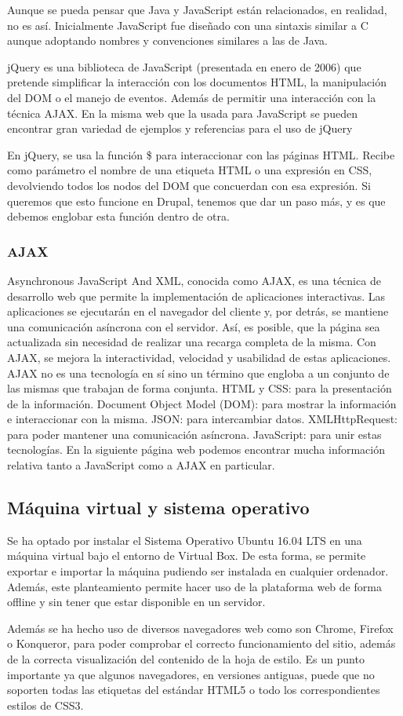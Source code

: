 Aunque se pueda pensar que Java y JavaScript están relacionados, en realidad, no es así. Inicialmente JavaScript fue diseñado con una sintaxis similar a C aunque adoptando nombres y convenciones similares a las de Java.

jQuery es una biblioteca de JavaScript (presentada en enero de 2006) que pretende simplificar la interacción con los documentos HTML, la manipulación del DOM o el manejo de eventos. Además de permitir una interacción con la técnica AJAX.
En la misma web que la usada para JavaScript se pueden encontrar gran variedad de ejemplos y referencias para el uso de jQuery

En jQuery, se usa la función \$ para interaccionar con las páginas HTML. Recibe como parámetro el nombre de una etiqueta HTML o una expresión en CSS, devolviendo todos los nodos del DOM que concuerdan con esa expresión. Si queremos que esto funcione en Drupal, tenemos que dar un paso más, y es que debemos englobar esta función dentro de otra.

\subsubsection{AJAX}
Asynchronous JavaScript And XML, conocida como AJAX, es una técnica de desarrollo web que permite la implementación de aplicaciones interactivas. Las aplicaciones se ejecutarán en el navegador del cliente y, por detrás, se mantiene una comunicación asíncrona con el servidor. Así, es posible, que la página sea actualizada sin necesidad de realizar una recarga completa de la misma. Con AJAX, se mejora la interactividad, velocidad y usabilidad de estas aplicaciones. AJAX no es una tecnología en sí sino un término que engloba a un conjunto de las mismas que trabajan de forma conjunta. HTML y CSS: para la presentación de la información. Document Object Model (DOM): para mostrar la información e interaccionar con la misma. JSON: para intercambiar datos. XMLHttpRequest: para poder mantener una comunicación asíncrona. JavaScript: para unir estas tecnologías. En la siguiente página web podemos encontrar mucha información relativa tanto a JavaScript como a AJAX en particular.

\subsection{Máquina virtual y sistema operativo}
Se ha optado por instalar el Sistema Operativo Ubuntu 16.04 LTS en una máquina virtual bajo el entorno de Virtual Box. De esta forma, se permite exportar e importar la máquina pudiendo ser instalada en cualquier ordenador. Además, este planteamiento permite hacer uso de la plataforma web de forma offline y sin tener que estar disponible en un servidor.

Además se ha hecho uso de diversos navegadores web como son Chrome, Firefox o Konqueror, para poder comprobar el correcto funcionamiento del sitio, además de la correcta visualización del contenido de la hoja de estilo. Es un punto importante ya que algunos navegadores, en versiones antiguas, puede que no soporten todas las etiquetas del estándar HTML5 o todo los correspondientes estilos de CSS3.

